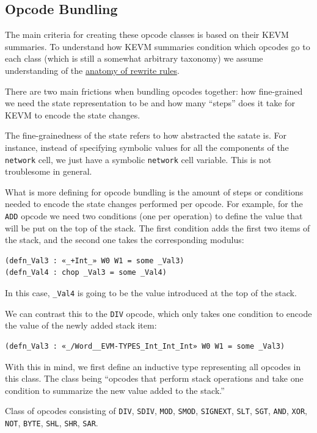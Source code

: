 \subsection{Opcode Bundling}

The main criteria for creating these opcode classes is based on their KEVM
summaries. To understand how KEVM summaries condition which opcodes go to each
class (which is still a somewhat arbitrary taxonomy) we assume understanding of
the
\href{https://github.com/runtimeverification/evm-equivalence/tree/master/EvmEquivalence/Equivalence#anatomy-of-a-rewrite-rule}{anatomy
  of rewrite rules}.

There are two main frictions when bundling opcodes together: how fine-grained we
need the state representation to be and how many ``steps'' does it take for KEVM
to encode the state changes.

The fine-grainedness of the state refers to how abstracted the satate is. For
instance, instead of specifying symbolic values for all the components of the
\texttt{network} cell, we just have a symbolic \texttt{network} cell variable.
This is not troublesome in general.

What is more defining for opcode bundling is the amount of steps or conditions
needed to encode the state changes performed per opcode. For example, for the
\texttt{ADD} opcode we need two conditions (one per operation) to define the
value that will be put on the top of the stack. The first condition adds the
first two items of the stack, and the second one takes the corresponding
modulus:
\begin{verbatim}
(defn_Val3 : «_+Int_» W0 W1 = some _Val3)
(defn_Val4 : chop _Val3 = some _Val4)
\end{verbatim}
In this case, \texttt{_Val4} is going to be the value introduced at the top of
the stack.

We can contrast this to the \texttt{DIV} opcode, which only takes one condition
to encode the value of the newly added stack item:
\begin{verbatim}
(defn_Val3 : «_/Word__EVM-TYPES_Int_Int_Int» W0 W1 = some _Val3)
\end{verbatim}

With this in mind, we first define an inductive type representing all opcodes in
this class. The class being ``opcodes that perform stack operations and take one
condition to summarize the new value added to the stack.''

\begin{definition}[stackOps_op]\label{def:OneOp.stackOps}
\leanok
Class of opcodes consisting of
\texttt{DIV}, \texttt{SDIV}, \texttt{MOD}, \texttt{SMOD}, \texttt{SIGNEXT},
\texttt{SLT}, \texttt{SGT}, \texttt{AND}, \texttt{XOR}, \texttt{NOT},
\texttt{BYTE}, \texttt{SHL}, \texttt{SHR}, \texttt{SAR}.
\end{definition}

